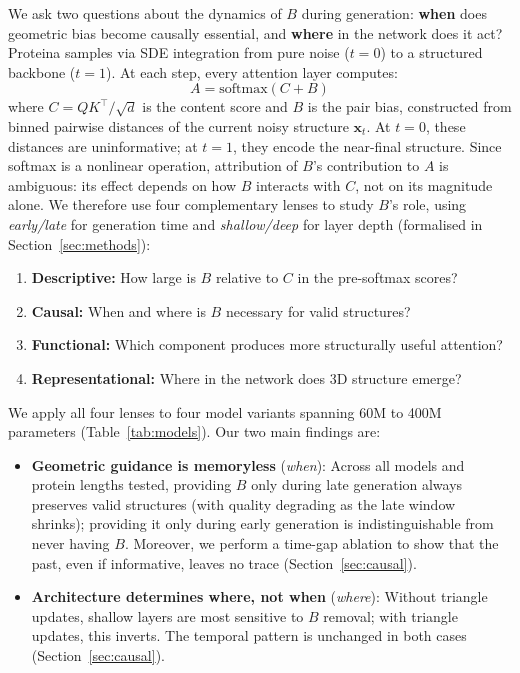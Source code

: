 \documentclass{article}
\begin{document}
We ask two questions about the dynamics of $B$ during generation: \textbf{when} does geometric bias become causally essential, and \textbf{where} in the network does it act?
Proteina samples via SDE integration from pure noise ($t{=}0$) to a structured backbone ($t{=}1$).
At each step, every attention layer computes:
\begin{equation}
    A = \mathrm{softmax}(C + B)
    \label{eq:attention}
\end{equation}
where $C = QK^\top / \sqrt{d}$ is the content score and $B$ is the pair bias, constructed from binned pairwise distances of the current noisy structure $\mathbf{x}_t$.
At $t{=}0$, these distances are uninformative; at $t{=}1$, they encode the near-final structure.
Since softmax is a nonlinear operation, attribution of $B$'s contribution to $A$ is ambiguous: its effect depends on how $B$ interacts with $C$, not on its magnitude alone. We therefore use four complementary lenses to study $B$'s role, using \emph{early/late} for generation time and \emph{shallow/deep} for layer depth (formalised in Section~\ref{sec:methods}):
\begin{enumerate}
    \item \textbf{Descriptive:} How large is $B$ relative to $C$ in the pre-softmax scores?
    \item \textbf{Causal:} When and where is $B$ necessary for valid structures?
    \item \textbf{Functional:} Which component produces more structurally useful attention?
    \item \textbf{Representational:} Where in the network does 3D structure emerge?
\end{enumerate}
We apply all four lenses to four model variants spanning 60M to 400M parameters (Table~\ref{tab:models}).
Our two main findings are:
\begin{itemize}
    \item \textbf{Geometric guidance is memoryless} (\emph{when}): Across all models and protein lengths tested, providing $B$ only during late generation always preserves valid structures (with quality degrading as the late window shrinks); providing it only during early generation is indistinguishable from never having $B$. Moreover, we perform a time-gap ablation to show that the past, even if informative, leaves no trace (Section~\ref{sec:causal}).
    \item \textbf{Architecture determines where, not when} (\emph{where}): Without triangle updates, shallow layers are most sensitive to $B$ removal; with triangle updates, this inverts. The temporal pattern is unchanged in both cases (Section~\ref{sec:causal}).
\end{itemize}
\end{document}
